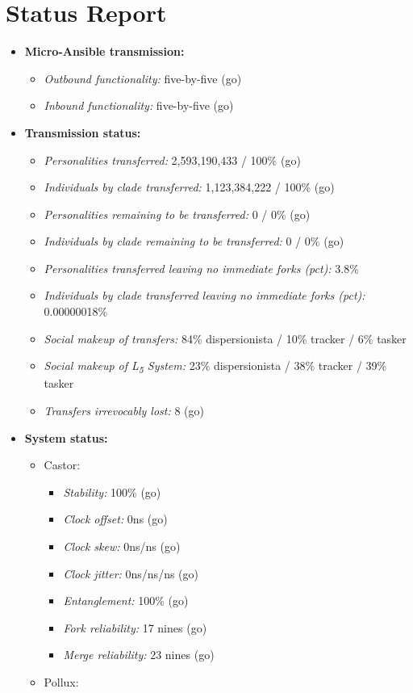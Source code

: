 \hypertarget{status-report}{%
\section*{Status Report}\label{status-report}}

\begin{itemize}
\tightlist
\item
  \textbf{Micro-Ansible transmission:}

  \begin{itemize}
  \tightlist
  \item
    \emph{Outbound functionality:} five-by-five (go)
  \item
    \emph{Inbound functionality:} five-by-five (go)
  \end{itemize}
\item
  \textbf{Transmission status:}

  \begin{itemize}
  \tightlist
  \item
    \emph{Personalities transferred:} 2,593,190,433 / 100\% (go)
  \item
    \emph{Individuals by clade transferred:} 1,123,384,222 / 100\% (go)
  \item
    \emph{Personalities remaining to be transferred:} 0 / 0\% (go)
  \item
    \emph{Individuals by clade remaining to be transferred:} 0 / 0\% (go)
  \item
    \emph{Personalities transferred leaving no immediate forks (pct):} 3.8\%
  \item
    \emph{Individuals by clade transferred leaving no immediate forks (pct):} 0.00000018\%
  \item
    \emph{Social makeup of transfers:} 84\% dispersionista / 10\% tracker / 6\% tasker
  \item
    \emph{Social makeup of L\textsubscript{5} System:} 23\% dispersionista / 38\% tracker / 39\% tasker
  \item
    \emph{Transfers irrevocably lost:} 8 (go)
  \end{itemize}
\item
  \textbf{System status:}

  \begin{itemize}
  \tightlist
  \item
    Castor:

    \begin{itemize}
    \tightlist
    \item
      \emph{Stability:} 100\% (go)
    \item
      \emph{Clock offset:} 0ns (go)
    \item
      \emph{Clock skew:} 0ns/ns (go)
    \item
      \emph{Clock jitter:} 0ns/ns/ns (go)
    \item
      \emph{Entanglement:} 100\% (go)
    \item
      \emph{Fork reliability:} 17 nines (go)
    \item
      \emph{Merge reliability:} 23 nines (go)
    \end{itemize}
  \item
    Pollux:


\end{itemize}
\end{itemize}
